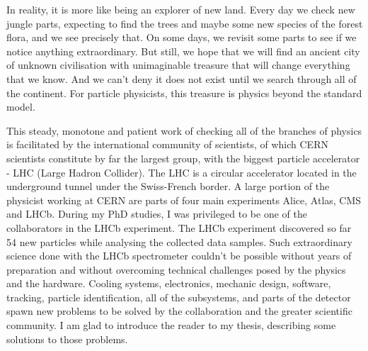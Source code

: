 In reality, it is more like being an explorer of new land.
Every day we check new jungle parts, expecting to find the trees and maybe some new species of the forest flora, and we see precisely that.
On some days, we revisit some parts to see if we notice anything extraordinary.
But still, we hope that we will find an ancient city of unknown civilisation with unimaginable treasure that will change everything that we know.
And we can't deny it does not exist until we search through all of the continent.
For particle physicists, this treasure is physics beyond the standard model.

This steady, monotone and patient work of checking all of the branches of physics is facilitated by the international community of scientists, of which CERN scientists constitute by far the largest group, with the biggest particle accelerator - LHC (Large Hadron Collider).
The LHC is a circular accelerator located in the underground tunnel under the Swiss-French border.
A large portion of the physicist working at CERN are parts of four main experiments Alice, Atlas, CMS and LHCb.
During my PhD studies, I was privileged to be one of the collaborators in the LHCb experiment.
The LHCb experiment discovered so far 54 new particles while analysing the collected data samples.
Such extraordinary science done with the LHCb spectrometer couldn't be possible without years of preparation and without overcoming technical challenges posed by the physics and the hardware.
Cooling systems, electronics, mechanic design, software, tracking, particle identification, all of the subsystems, and parts of the detector spawn new problems to be solved by the collaboration and the greater scientific community.
I am glad to introduce the reader to my thesis, describing some solutions to those problems.
